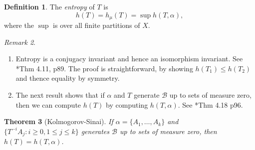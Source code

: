 \documentclass[a4paper]{amsart}
\theoremstyle{plain}
\newtheorem{theorem}{Theorem}[section]
\theoremstyle{definition}
\newtheorem{definition}[theorem]{Definition}%
\theoremstyle{remark}
\newtheorem{remark}[theorem]{Remark}
\begin{document}
 
\begin{definition} The \emph{entropy} of $ T $ is
\[ h(T)  = h_\mu (T) = \sup h(T, \alpha) ,\]
where the $ \sup $ is over all finite partitions of $ X $.
\end{definition}

\begin{remark} \mbox{}
\begin{enumerate}
 \item Entropy is a conjugacy invariant and hence an isomorphism invariant.
See \cite{Wal}*{Thm 4.11, p89}. 
The proof is straightforward, by showing $ h(T_1) \leq h(T_2) $ and thence equality by symmetry.

\item The next result shows that if $ \alpha $ and $ T $ generate $ \mathcal{B} $ up to sets of measure zero, then we can compute $ h(T) $ by computing $ h(T, \alpha ) $.  See \cite{Wal}*{Thm 4.18 p96}.
\end{enumerate}
 \end{remark}
 
\begin{theorem}[Kolmogorov-Sinai]
If $ \alpha = \{A_1,\dots, A_k\} $ and $ \{T^{-i}A_j : i \geq 0, 1\leq j \leq k \} $ generates $ \mathcal{B} $ up to sets of measure zero, then $ h(T) = h(T, \alpha ) $.
\end{theorem}
\end{document}
